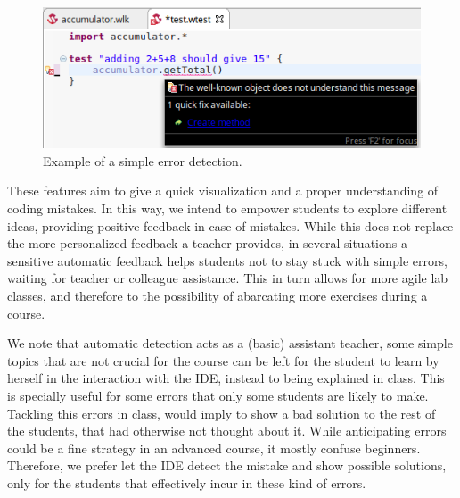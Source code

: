 \begin{figure}[ht]
 \centering
 \includegraphics[scale=0.5, trim={0 0 0.15cm 0},clip]{images/errorReporting.png}
 \caption{\small Example of a simple error detection.}
 \label{fig:errorReporting}
\end{figure}

These features aim to give a quick visualization and a proper understanding of coding mistakes. In this way, we intend to empower students to explore different ideas, providing positive feedback in case of mistakes.
While this does not replace the more personalized feedback a teacher provides, in several situations a sensitive automatic feedback helps students not to stay stuck with simple errors, waiting for teacher or colleague assistance.
This in turn allows for more agile lab classes, and therefore to the possibility of abarcating more exercises during a course.

\medskip
We note that automatic detection acts as a (basic) assistant teacher, \ie some simple topics that are not crucial for the course can be left for the student to learn by herself in the interaction with the IDE, instead to being explained in class.
This is specially useful for some errors that only some students are likely to make.
Tackling this errors in class, would imply to show a bad solution to the rest of the students, that had otherwise not thought about it. While anticipating errors could be a fine strategy in an advanced course, it mostly confuse beginners.
Therefore, we prefer let the IDE detect the mistake and show possible solutions, only for the students that effectively incur in these kind of errors.



